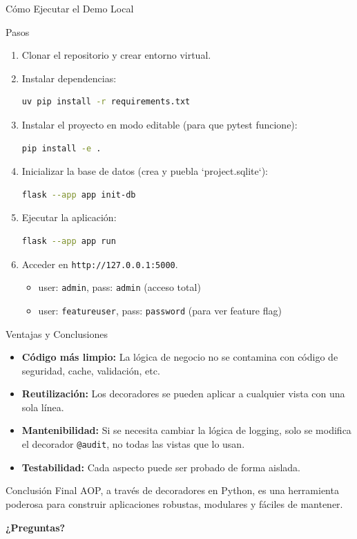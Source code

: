 \documentclass[spanish]{beamer}
\begin{document}
\begin{frame}[fragile]{Cómo Ejecutar el Demo Local}
    \begin{block}{Pasos}
    \begin{enumerate}
        \item Clonar el repositorio y crear entorno virtual.
        \item Instalar dependencias:
        \begin{lstlisting}[language=bash]
uv pip install -r requirements.txt
        \end{lstlisting}
        \item Instalar el proyecto en modo editable (para que pytest funcione):
        \begin{lstlisting}[language=bash]
pip install -e .
        \end{lstlisting}
        \item Inicializar la base de datos (crea y puebla `project.sqlite`):
        \begin{lstlisting}[language=bash]
flask --app app init-db
        \end{lstlisting}
        \item Ejecutar la aplicación:
        \begin{lstlisting}[language=bash]
flask --app app run
        \end{lstlisting}
        \item Acceder en \texttt{http://127.0.0.1:5000}.
            \begin{itemize}
                \item user: \texttt{admin}, pass: \texttt{admin} (acceso total)
                \item user: \texttt{featureuser}, pass: \texttt{password} (para ver feature flag)
            \end{itemize}
    \end{enumerate}
    \end{block}
\end{frame}

\begin{frame}{Ventajas y Conclusiones}
    \begin{itemize}
        \item<1-> \textbf{Código más limpio:} La lógica de negocio no se contamina con código de seguridad, cache, validación, etc.
        \item<2-> \textbf{Reutilización:} Los decoradores se pueden aplicar a cualquier vista con una sola línea.
        \item<3-> \textbf{Mantenibilidad:} Si se necesita cambiar la lógica de logging, solo se modifica el decorador \texttt{@audit}, no todas las vistas que lo usan.
        \item<4-> \textbf{Testabilidad:} Cada aspecto puede ser probado de forma aislada.
    \end{itemize}
    \vfill
    \begin{alertblock}{Conclusión Final}
        AOP, a través de decoradores en Python, es una herramienta poderosa para construir aplicaciones robustas, modulares y fáciles de mantener.
    \end{alertblock}
\end{frame}

\begin{frame}
    \begin{center}
        \Huge\bfseries ¿Preguntas?
    \end{center}
\end{frame}
\end{document}
